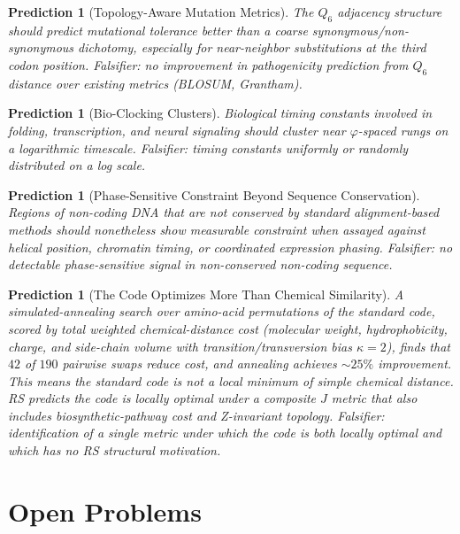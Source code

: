 \documentclass[11pt,a4paper]{article}
\newtheorem{prediction}[theorem]{Prediction}
\newcommand{\Jcost}{J}
\newcommand{\ph}{\varphi}
\newcommand{\Qsix}{\ensuremath{Q_6}}
\begin{document}
\begin{prediction}[Topology-Aware Mutation Metrics]
\label{pred:q6}
The \Qsix{} adjacency structure should predict mutational tolerance better than a coarse synonymous/non-synonymous dichotomy, especially for near-neighbor substitutions at the third codon position. \emph{Falsifier}: no improvement in pathogenicity prediction from \Qsix{} distance over existing metrics (BLOSUM, Grantham).
\end{prediction}

\begin{prediction}[Bio-Clocking Clusters]
\label{pred:bioclock}
Biological timing constants involved in folding, transcription, and neural signaling should cluster near $\ph$-spaced rungs on a logarithmic timescale. \emph{Falsifier}: timing constants uniformly or randomly distributed on a log scale.
\end{prediction}

\begin{prediction}[Phase-Sensitive Constraint Beyond Sequence Conservation]
\label{pred:phase}
Regions of non-coding DNA that are not conserved by standard alignment-based methods should nonetheless show measurable constraint when assayed against helical position, chromatin timing, or coordinated expression phasing. \emph{Falsifier}: no detectable phase-sensitive signal in non-conserved non-coding sequence.
\end{prediction}

\begin{prediction}[The Code Optimizes More Than Chemical Similarity]
\label{pred:composite}
A simulated-annealing search over amino-acid permutations of the standard code, scored by total weighted chemical-distance cost (molecular weight, hydrophobicity, charge, and side-chain volume with transition/transversion bias $\kappa{=}2$), finds that $42$ of $190$ pairwise swaps \emph{reduce} cost, and annealing achieves $\sim 25\%$ improvement.  This means the standard code is \emph{not} a local minimum of simple chemical distance.  RS predicts the code is locally optimal under a \emph{composite} $\Jcost$ metric that also includes biosynthetic-pathway cost and Z-invariant topology.  \emph{Falsifier}: identification of a single metric under which the code is both locally optimal and which has no RS structural motivation.
\end{prediction}

\section{Open Problems}
\label{sec:open}
\end{document}
